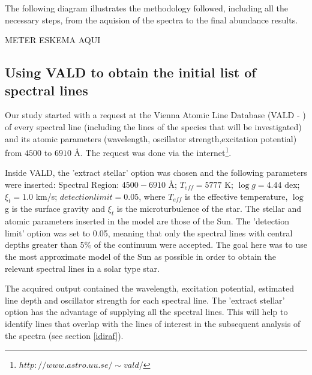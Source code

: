 \documentclass[dvips,12pt,a4paper]{report}
\begin{document}
{The following diagram illustrates the methodology followed, including all the necessary steps, from the aquision of the spectra to the final abundance results.

METER ESKEMA AQUI


\subsection {Using VALD to obtain the initial list of spectral lines}
\label{VALD}
Our study started with a request at the Vienna Atomic Line Database (VALD - \citeauthor{Kupka-1999} \citeyear{Kupka-1999})  of every spectral line (including the lines of the species that will be investigated) and its atomic parameters (wavelength, oscillator strength,excitation potential) %
from $4500$ to $6910$ \AA. The request was done via the internet\footnote{$http://www.astro.uu.se/\sim vald/$}. %

Inside VALD, the 'extract stellar' option was chosen and the following parameters were inserted: Spectral Region: $4500-6910$ \AA ; $T_{eff}=5777$ K; $\log g=4.44$ dex; $\xi_t=1.0$ km/s; $detection limit=0.05$, where $T_{eff}$ is the effective temperature, $\log$ g is the surface gravity and $\xi_t$ is the microturbulence of the star. The stellar and atomic parameters inserted in the model are those of the Sun. The 'detection limit' option was set to 0.05, meaning that only the spectral lines with central depths greater than 5\% of the continuum were accepted. The goal here was to use the most approximate model of the Sun as possible in order to obtain the relevant spectral lines in a solar type star. 

The acquired output contained the wavelength, excitation potential, estimated line depth and oscillator strength for each spectral line. The 'extract stellar' option has the advantage of supplying all the spectral lines. This will help to identify lines that overlap with the lines of interest in the subsequent analysis of the spectra (see section \ref{idiraf}).


}
\end{document}
